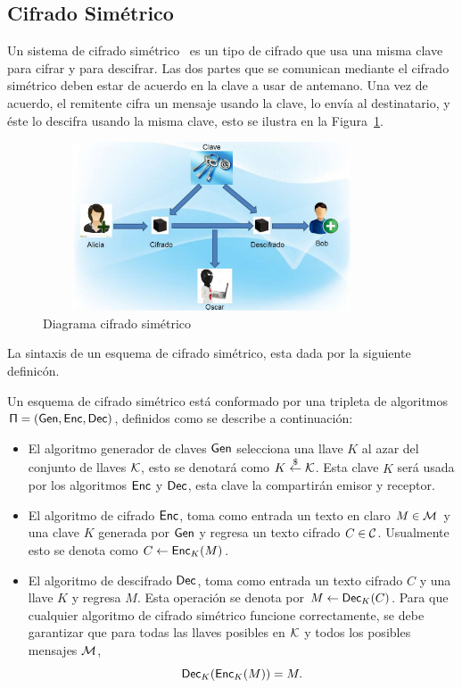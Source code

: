 \subsection{Cifrado Simétrico}
Un sistema de cifrado simétrico~\cite{sime} es un tipo de cifrado que usa una misma clave para cifrar y para descifrar. Las dos partes que se comunican mediante el cifrado simétrico deben estar de acuerdo en la clave a usar de antemano. Una vez de acuerdo, el remitente cifra un mensaje usando la clave, lo envía al destinatario, y éste lo descifra usando la misma clave, esto se ilustra en la Figura~\ref{fig:1-2-1}.

\begin{figure}[H]
\centering
	\includegraphics[width=10cm, height=5cm]{./images/simetrico.jpg}
	\caption{Diagrama cifrado simétrico}
	\label{fig:1-2-1}
\end{figure}
La sintaxis de un esquema de cifrado sim\'etrico, esta dada por la siguiente definic\'on.
\begin{definition} 
Un esquema de cifrado sim\'etrico est\'a conformado por una tripleta de algoritmos 
$\sf \Pi=(Gen, Enc, Dec)$, definidos como se describe a continuaci\'on:
\begin{itemize}
\item  El algoritmo generador de claves $\sf Gen$ selecciona una llave  $K$ al azar del conjunto de llaves $\cal K$, esto se denotar\'a como $K \stackrel{\$}\leftarrow {\cal K}$.
Esta clave $K$  ser\'a usada por los algoritmos  $\sf Enc$ y $\sf Dec$, esta clave la compartir\'an  emisor y receptor. 
\item El algoritmo de cifrado $\sf Enc$, toma como entrada un texto en claro  $M \in {\cal M}$ y una clave $K$ generada por  $\sf Gen$  y regresa un texto cifrado $C \in {\cal C}$.  Usualmente esto se denota como $C \leftarrow {\sf Enc}_K(M)$.
 \item El algoritmo de descifrado $\sf Dec$, toma como entrada un texto cifrado $C$ y una llave $K$ y regresa $M$. Esta operaci\'on se denota por  $M \leftarrow {\sf Dec}_K(C)$.
Para que cualquier algoritmo de cifrado sim\'etrico funcione correctamente, se debe garantizar que para
todas las llaves posibles en  $\cal K$ y todos los posibles mensajes $\cal M$, $$ {\sf Dec}_K({\sf Enc}_K(M)) = M.$$
\end{itemize}
\end{definition}

